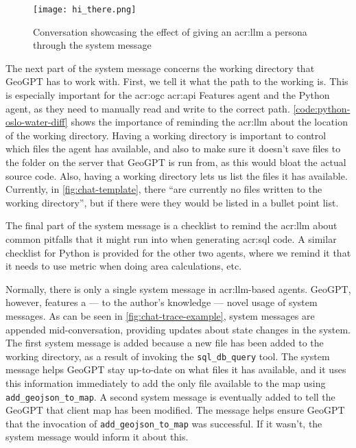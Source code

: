 \begin{figure}[H]
    \centering
    \texttt{[image: hi\_there.png]}
    \caption{Conversation showcasing the effect of giving an \acrshort{acr:llm} a persona through the system message}
    \label{fig:effect-of-system-message}
\end{figure}

The next part of the system message concerns the working directory that GeoGPT has to work with. First, we tell it what the path to the working is. This is especially important for the \acrshort{acr:ogc} \acrshort{acr:api} Features agent and the Python agent, as they need to manually read and write to the correct path. \autoref{code:python-oslo-water-diff} shows the importance of reminding the \acrshort{acr:llm} about the location of the working directory. Having a working directory is important to control which files the agent has available, and also to make sure it doesn't save files to the folder on the server that GeoGPT is run from, as this would bloat the actual source code. Also, having a working directory lets us list the files it has available. Currently, in \autoref{fig:chat-template}, there \enquote{are currently no files written to the working directory}, but if there were they would be listed in a bullet point list.

The final part of the system message is a checklist to remind the \acrshort{acr:llm} about common pitfalls that it might run into when generating \acrshort{acr:sql} code. A similar checklist for Python is provided for the other two agents, where we remind it that it needs to use metric  when doing area calculations, etc.

Normally, there is only a single system message in \acrshort{acr:llm}-based agents. GeoGPT, however, features a --- to the author's knowledge --- novel usage of system messages. As can be seen in \autoref{fig:chat-trace-example}, system messages are appended mid-conversation, providing updates about state changes in the system. The first system message is added because a new file has been added to the working directory, as a result of invoking the \texttt{sql\_db\_query} tool. The system message helps GeoGPT stay up-to-date on what files it has available, and it uses this information immediately to add the only file available to the map using \texttt{add\_geojson\_to\_map}. A second system message is eventually added to tell the GeoGPT that client map has been modified. The message helps ensure GeoGPT that the invocation of \texttt{add\_geojson\_to\_map} was successful. If it wasn't, the system message would inform it about this.

\glsresetall


